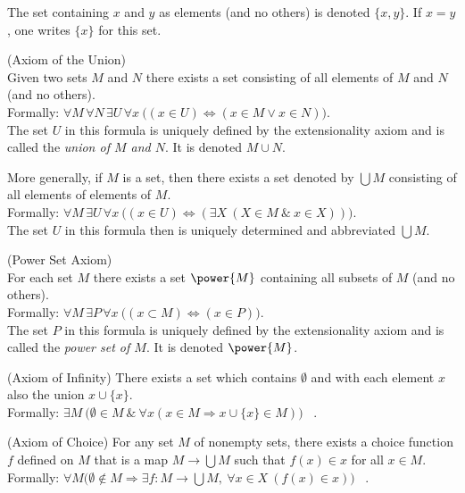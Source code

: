\begin{axiomlist}[S]
  The set containing $x$ and $y$ as elements (and no others) is denoted  $\{ x , y \}$. 
  If $x = y$, one writes $\{ x \}$ for this set. 
\item ({\sffamily Axiom of the Union}) \\
  Given two sets $M$ and $N$ there exists a set consisting of all elements 
  of $M$ and $N$ (and no others). \\
  Formally: $\forall M \, \forall N \, \exists U \, \forall x \: \big((x \in U ) \Leftrightarrow ( x \in M \vee x \in N)\big) $.\\[1mm]
  The set $U$ in this formula is uniquely defined by the extensionality axiom and is 
  called the \emph{union of $M$ and $N$}. It is denoted $M \cup N$. 

  More generally, if $M$ is a set, then there exists a set denoted by $\bigcup M$ consisting of all 
  elements of elements of $M$. \\
  Formally: $\forall M \, \exists U \, \forall x \: \big((x \in U ) \Leftrightarrow 
  ( \exists X \: ( X \in M \: \& \: x \in X ))\big) $. \\[1mm]
  The set $U$ in this formula then is uniquely determined and abbreviated $\bigcup M$.  
\item ({\sffamily Power Set Axiom}) \\
  For each set $M$ there exists a set $\power{M}$ containing all subsets of $M$ (and no others). \\
  Formally: $\forall M \, \exists P \, \forall x \: \big( (x \subset M) \Leftrightarrow ( x\in P) \big)$. 
  \\[1mm]
  The set $P$ in this formula is uniquely defined by the extensionality axiom and is 
  called the \emph{power set of $M$}. It is denoted $\power{M}$. 
\item ({\sffamily Axiom of Infinity})
  There exists a set which contains $\emptyset$ and with each element $x$ also the union 
  $x \cup \{ x\}$. \\ 
  Formally: $\exists M \: \big( \emptyset \in M \: \& \: \forall x ( x \in M \Rightarrow x \cup \{x\} \in M) \big)$ \ .
\item ({\sffamily Axiom of Choice})
   For any set $M$ of nonempty sets, there exists a choice function $f$ defined on $M$ that is a map
   $M \to \bigcup M$ such that $f(x) \in x$ for all $x \in M$. \\ 
   Formally:   $\forall M \big( \emptyset \notin M \Rightarrow \exists f : M \to \bigcup M, \: 
   \forall x \in X \: ( f(x) \in x) \big) $ \ .
\end{axiomlist}

